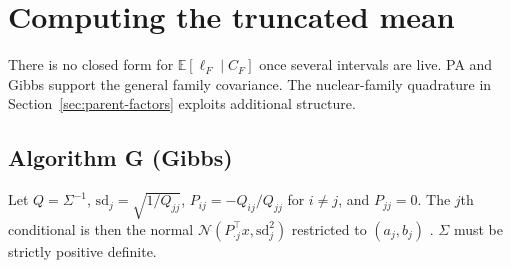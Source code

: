 \documentclass[11pt,a4paper]{article}
\newcommand{\E}{\mathbb{E}}
\begin{document}
\section{Computing the truncated mean}
\label{sec:engines}

There is no closed form for $\E[\ell_F\mid C_F]$ once several
intervals are live.
PA and Gibbs support the general family covariance. The nuclear-family
quadrature in Section~\ref{sec:parent-factors} exploits additional structure.

\subsection{Algorithm G (Gibbs)}

Let $Q=\Sigma^{-1}$,
$\mathrm{sd}_j=\sqrt{1/Q_{jj}}$,
$P_{ij}=-Q_{ij}/Q_{jj}$ for $i\neq j$, and $P_{jj}=0$.
The $j$th conditional is then the normal
$\mathcal{N}(P_{\cdot j}^{\top}x,\mathrm{sd}_j^{2})$ restricted
to $(a_j,b_j)$ \cite{kotecha1999}.
$\Sigma$ must be strictly positive definite.
\end{document}
